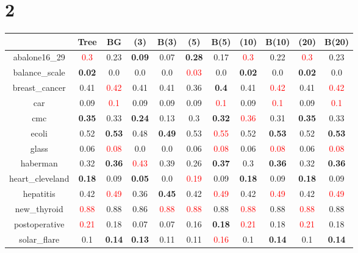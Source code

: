 \documentclass{article}%
\begin{document}
\section*{2}%
\begin{tabular}{c|cccccccccc}%
\hline%
&Tree&BG&(3)&B(3)&(5)&B(5)&(10)&B(10)&(20)&B(20)\\%
\hline%
abalone16\_29&\textcolor{red}{ 
0.3
}&0.23&\textbf{0.09}&0.07&\textbf{0.28}&0.17&\textcolor{red}{ 
0.3
}&0.22&\textcolor{red}{ 
0.3
}&0.23\\%
\hline%
balance\_scale&\textbf{0.02}&0.0&0.0&0.0&\textcolor{red}{ 
0.03
}&0.0&\textbf{0.02}&0.0&\textbf{0.02}&0.0\\%
\hline%
breast\_cancer&0.41&\textcolor{red}{ 
0.42
}&0.41&0.41&0.36&\textbf{0.4}&0.41&\textcolor{red}{ 
0.42
}&0.41&\textcolor{red}{ 
0.42
}\\%
\hline%
car&0.09&\textcolor{red}{ 
0.1
}&0.09&0.09&0.09&\textcolor{red}{ 
0.1
}&0.09&\textcolor{red}{ 
0.1
}&0.09&\textcolor{red}{ 
0.1
}\\%
\hline%
cmc&\textbf{0.35}&0.33&\textbf{0.24}&0.13&0.3&\textbf{0.32}&\textcolor{red}{ 
0.36
}&0.31&\textbf{0.35}&0.33\\%
\hline%
ecoli&0.52&\textbf{0.53}&0.48&\textbf{0.49}&0.53&\textcolor{red}{ 
0.55
}&0.52&\textbf{0.53}&0.52&\textbf{0.53}\\%
\hline%
glass&0.06&\textcolor{red}{ 
0.08
}&0.0&0.0&0.06&\textcolor{red}{ 
0.08
}&0.06&\textcolor{red}{ 
0.08
}&0.06&\textcolor{red}{ 
0.08
}\\%
\hline%
haberman&0.32&\textbf{0.36}&\textcolor{red}{ 
0.43
}&0.39&0.26&\textbf{0.37}&0.3&\textbf{0.36}&0.32&\textbf{0.36}\\%
\hline%
heart\_cleveland&\textbf{0.18}&0.09&\textbf{0.05}&0.0&\textcolor{red}{ 
0.19
}&0.09&\textbf{0.18}&0.09&\textbf{0.18}&0.09\\%
\hline%
hepatitis&0.42&\textcolor{red}{ 
0.49
}&0.36&\textbf{0.45}&0.42&\textcolor{red}{ 
0.49
}&0.42&\textcolor{red}{ 
0.49
}&0.42&\textcolor{red}{ 
0.49
}\\%
\hline%
new\_thyroid&\textcolor{red}{ 
0.88
}&0.88&0.86&\textcolor{red}{ 
0.88
}&\textcolor{red}{ 
0.88
}&0.88&\textcolor{red}{ 
0.88
}&0.88&\textcolor{red}{ 
0.88
}&0.88\\%
\hline%
postoperative&\textcolor{red}{ 
0.21
}&0.18&0.07&0.07&0.16&\textbf{0.18}&\textcolor{red}{ 
0.21
}&0.18&\textcolor{red}{ 
0.21
}&0.18\\%
\hline%
solar\_flare&0.1&\textbf{0.14}&\textbf{0.13}&0.11&0.11&\textcolor{red}{ 
0.16
}&0.1&\textbf{0.14}&0.1&\textbf{0.14}\\%

\end{tabular}
\end{document}
